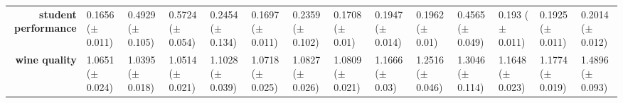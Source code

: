 \begin{sidewaystable}[htbp]
{\begin{tabular}{r|lll|l|l|l|l|l|lllll}
			\textbf{student performance}        & \cellcolor[rgb]{ .388,  .745,  .482}0.1656 ($\pm$0.011)                        & \cellcolor[rgb]{ .98,  .522,  .443}0.4929 ($\pm$0.105)  & \cellcolor[rgb]{ .973,  .412,  .42}0.5724 ($\pm$0.054)  & \cellcolor[rgb]{ 1,  .855,  .506}0.2454 ($\pm$0.134)    & \cellcolor[rgb]{ .471,  .769,  .486}0.1697 ($\pm$0.011) & \cellcolor[rgb]{ 1,  .871,  .51}0.2359 ($\pm$0.102)     & \cellcolor[rgb]{ .49,  .773,  .486}0.1708 ($\pm$0.01)   & \cellcolor[rgb]{ .969,  .91,  .514}0.1947 ($\pm$0.014)  & \cellcolor[rgb]{ 1,  .922,  .518}0.1962 ($\pm$0.01)     & \cellcolor[rgb]{ .984,  .573,  .451}0.4565 ($\pm$0.049) & \cellcolor[rgb]{ .933,  .902,  .514}0.193 ($\pm$0.011)  & \cellcolor[rgb]{ .925,  .898,  .51}0.1925 ($\pm$0.011)  & \cellcolor[rgb]{ 1,  .918,  .518}0.2014 ($\pm$0.012)    \\
			\textbf{wine quality}               & \cellcolor[rgb]{ .631,  .816,  .494}1.0651 ($\pm$0.024)                        & \cellcolor[rgb]{ .388,  .745,  .482}1.0395 ($\pm$0.018) & \cellcolor[rgb]{ .502,  .776,  .486}1.0514 ($\pm$0.021) & \cellcolor[rgb]{ 1,  .922,  .518}1.1028 ($\pm$0.039)    & \cellcolor[rgb]{ .698,  .831,  .498}1.0718 ($\pm$0.025) & \cellcolor[rgb]{ .804,  .863,  .506}1.0827 ($\pm$0.026) & \cellcolor[rgb]{ .788,  .859,  .502}1.0809 ($\pm$0.021) & \cellcolor[rgb]{ .996,  .839,  .502}1.1666 ($\pm$0.03)  & \cellcolor[rgb]{ .992,  .725,  .482}1.2516 ($\pm$0.046) & \cellcolor[rgb]{ .988,  .659,  .467}1.3046 ($\pm$0.114) & \cellcolor[rgb]{ .996,  .843,  .502}1.1648 ($\pm$0.023) & \cellcolor[rgb]{ .996,  .824,  .502}1.1774 ($\pm$0.019) & \cellcolor[rgb]{ .973,  .412,  .42}1.4896 ($\pm$0.093)  \\
			\cmidrule{5-5}\cmidrule{7-7}\cmidrule{9-9}\end{tabular}%
	}
\end{sidewaystable}%